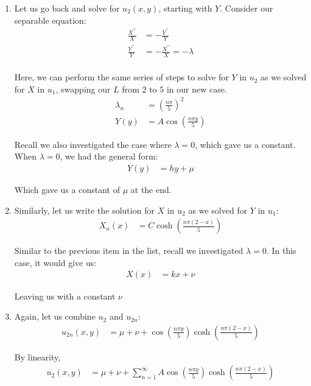 \begin{enumerate}
\hrulefill

\setcounter{enumii}{1}
\item Let us go back and solve for $u_2(x, y)$, starting with $Y$. Consider our separable equation:
%
\begin{align}
  \frac{X^{\prime\prime}}{X} & = - \frac{Y^{\prime\prime}}{Y}\\
  \frac{Y^{\prime\prime}}{Y} & = - \frac{X^{\prime\prime}}{X} = -\lambda\\
\end{align}

Here, we can perform the same series of steps to solve for $Y$ in $u_2$ as we solved for $X$ in $u_1$, swapping our $L$ from $2$ to $5$ in our new case.
%
\begin{align}
  \lambda_{n} & = \left(\frac{n \pi}{5}\right)^2\\
  Y(y) & = A \cos\left(\frac{n \pi y}{5}\right)
\end{align}

Recall we also investigated the case where $\lambda = 0$, which gave us a constant. When $\lambda = 0$, we had the general form:
%
\begin{align}
  Y(y) & = hy + \mu
\end{align}

Which gave us a constant of $\mu$ at the end.

\item Similarly, let us write the solution for $X$ in $u_2$ as we solved for $Y$ in $u_1$:
%
\begin{align}
  X_n(x) & = C \cosh\left(\frac{n \pi(2 - x)}{5}\right)
\end{align}

Similar to the previous item in the list, recall we investigated $\lambda = 0$. In this case, it would give us:
%
\begin{align}
  X(x) & = kx + \nu
\end{align}

Leaving us with a constant $\nu$
\item Again, let us combine $u_2$ and $u_{2n}$:
%
\begin{align}
  u_{2n}(x, y) & = \mu + \nu + \cos\left(\frac{n \pi y}{5}\right) \cosh\left(\frac{n \pi(2 - x)}{5}\right)
\end{align}

By linearity,
%
\begin{align}
  u_{2}(x, y) & = \mu + \nu + \sum^\infty_{n = 1} A \cos\left(\frac{n \pi y}{5}\right) \cosh\left(\frac{n \pi(2 - x)}{5}\right)
\end{align}


\end{enumerate}
